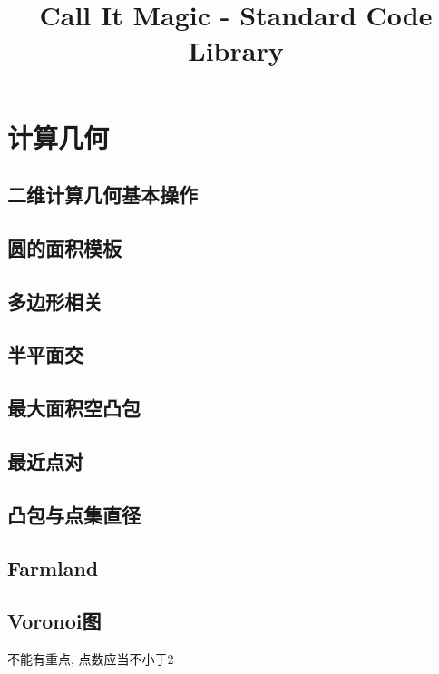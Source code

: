 \documentclass[landscape, twocolumn, 8pt, a4paper, twoside]{extarticle}
\title{Call It Magic - Standard Code Library}
\begin{document}
\tableofcontents
\newpage

\section{计算几何}

  \subsection{二维计算几何基本操作}
    
    
  \subsection{圆的面积模板}
    

  \subsection{多边形相关}
    

  \subsection{半平面交}
    

  \subsection{最大面积空凸包}
    

  \subsection{最近点对}
    

  \subsection{凸包与点集直径}
    

  \subsection{Farmland}
    

  \subsection{Voronoi图}
    不能有重点, 点数应当不小于2
    
\end{document}
